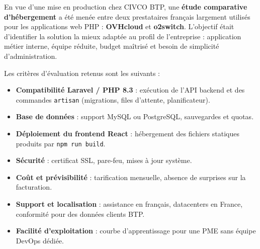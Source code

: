 En vue d'une mise en production chez CIVCO BTP, une \textbf{étude comparative
d'hébergement} a été menée entre deux prestataires français largement utilisés pour
les applications web PHP : \textbf{OVHcloud} et \textbf{o2switch}. L'objectif était
d'identifier la solution la mieux adaptée au profil de l'entreprise : application
métier interne, équipe réduite, budget maîtrisé et besoin de simplicité
d'administration.

\medskip

Les critères d'évaluation retenus sont les suivants :

\begin{itemize}
  \item \textbf{Compatibilité Laravel / PHP 8.3} : exécution de l'API backend et des
  commandes \texttt{artisan} (migrations, files d'attente, planificateur).
  \item \textbf{Base de données} : support MySQL ou PostgreSQL, sauvegardes et quotas.
  \item \textbf{Déploiement du frontend React} : hébergement des fichiers statiques
  produits par \texttt{npm run build}.
  \item \textbf{Sécurité} : certificat SSL, pare-feu, mises à jour système.
  \item \textbf{Coût et prévisibilité} : tarification mensuelle, absence de surprises
  sur la facturation.
  \item \textbf{Support et localisation} : assistance en français, datacenters en
  France, conformité pour des données clients BTP.
  \item \textbf{Facilité d'exploitation} : courbe d'apprentissage pour une PME sans
  équipe DevOps dédiée.
\end{itemize}

